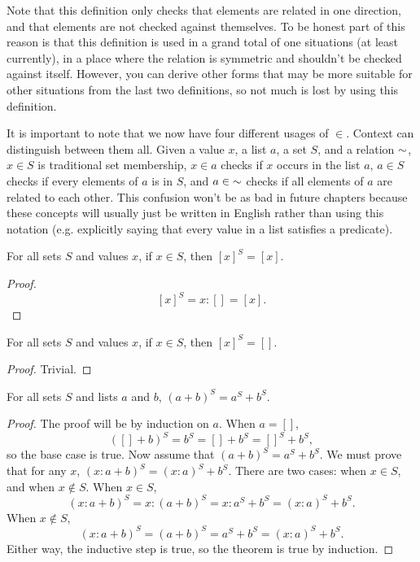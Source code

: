 \documentclass[../math.tex]{subfiles}
\begin{document}
Note that this definition only checks that elements are related in one
direction, and that elements are not checked against themselves.  To be honest
part of this reason is that this definition is used in a grand total of one
situations (at least currently), in a place where the relation is symmetric and
shouldn't be checked against itself.  However, you can derive other forms that
may be more suitable for other situations from the last two definitions, so not
much is lost by using this definition.

It is important to note that we now have four different usages of $\in$.
Context can distinguish between them all.  Given a value $x$, a list $a$, a set
$S$, and a relation ${\sim}$, $x \in S$ is traditional set membership, $x \in a$
checks if $x$ occurs in the list $a$, $a \in S$ checks if every elements of $a$
is in $S$, and $a \in {\sim}$ checks if all elements of $a$ are related to each
other.  This confusion won't be as bad in future chapters because these concepts
will usually just be written in English rather than using this notation (e.g.
explicitly saying that every value in a list satisfies a predicate).

\begin{theorem}
    For all sets $S$ and values $x$, if $x \in S$, then $[x]^S = [x]$.
\end{theorem}
\begin{proof}
    \[
        [x]^S = x : [] = [x].
    \]
\end{proof}

\begin{theorem}
    For all sets $S$ and values $x$, if $x \in S$, then $[x]^S = []$.
\end{theorem}
\begin{proof}
    Trivial.
\end{proof}

\begin{theorem}
    For all sets $S$ and lists $a$ and $b$, $(a + b)^S = a^S + b^S$.
\end{theorem}
\begin{proof}
    The proof will be by induction on $a$.  When $a = []$,
    \[
        ([] + b)^S = b^S = [] + b^S = []^S + b^S,
    \]
    so the base case is true.  Now assume that $(a + b)^S = a^S + b^S$.  We must
    prove that for any $x$, $(x : a + b)^S = (x : a)^S + b^S$.  There are two
    cases: when $x \in S$, and when $x \notin S$.  When $x \in S$,
    \[
        (x : a + b)^S = x : (a + b)^S = x : a^S + b^S = (x : a)^S + b^S.
    \]
    When $x \notin S$,
    \[
        (x : a + b)^S = (a + b)^S = a^S + b^S = (x : a)^S + b^S.
    \]
    Either way, the inductive step is true, so the theorem is true by induction.
\end{proof}
\end{document}
